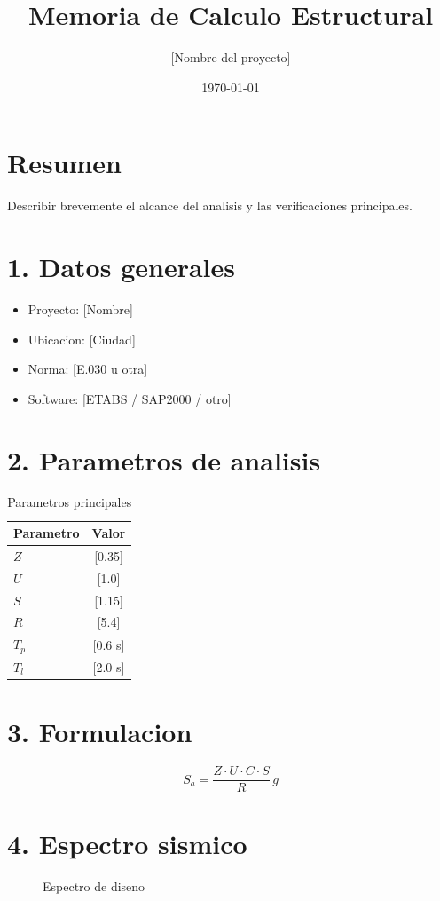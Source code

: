 \documentclass[paper=a4,fontsize=10pt]{scrartcl}
\title{\textbf{Memoria de Calculo Estructural}}
\author{[Nombre del proyecto]}
\date{\today}
\begin{document}
\onehalfspacing
\maketitle
\thispagestyle{fancy}

\section*{Resumen}
Describir brevemente el alcance del analisis y las verificaciones principales.

\section*{1. Datos generales}
\begin{itemize}
  \item Proyecto: [Nombre]
  \item Ubicacion: [Ciudad]
  \item Norma: [E.030 u otra]
  \item Software: [ETABS / SAP2000 / otro]
\end{itemize}

\section*{2. Parametros de analisis}
\begin{table}[H]
\centering
\caption{Parametros principales}
\begin{tabular}{lc}
\toprule
Parametro & Valor \\
\midrule
$Z$ & [0.35] \\
$U$ & [1.0] \\
$S$ & [1.15] \\
$R$ & [5.4] \\
$T_p$ & [0.6 s] \\
$T_l$ & [2.0 s] \\
\bottomrule
\end{tabular}
\end{table}

\section*{3. Formulacion}
\[
S_a = \frac{Z \cdot U \cdot C \cdot S}{R}\,g
\]

\section*{4. Espectro sismico}
\begin{figure}[H]
\centering
{}
\caption{Espectro de diseno}
\end{figure}
\end{document}
